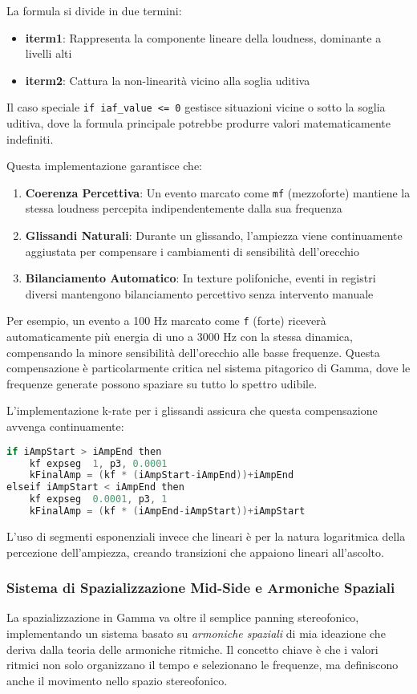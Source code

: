 La formula si divide in due termini:
\begin{itemize}
    \item \textbf{iterm1}: Rappresenta la componente lineare della loudness, dominante a livelli alti
    \item \textbf{iterm2}: Cattura la non-linearità vicino alla soglia uditiva
\end{itemize}

Il caso speciale \texttt{if iaf\_value <= 0} gestisce situazioni vicine o sotto la soglia uditiva, dove la formula principale potrebbe produrre valori matematicamente indefiniti.

Questa implementazione garantisce che:

\begin{enumerate}
    \item \textbf{Coerenza Percettiva}: Un evento marcato come \texttt{mf} (mezzoforte) mantiene la stessa loudness percepita indipendentemente dalla sua frequenza
    \item \textbf{Glissandi Naturali}: Durante un glissando, l'ampiezza viene continuamente aggiustata per compensare i cambiamenti di sensibilità dell'orecchio
    \item \textbf{Bilanciamento Automatico}: In texture polifoniche, eventi in registri diversi mantengono bilanciamento percettivo senza intervento manuale
\end{enumerate}
Per esempio, un evento a 100 Hz marcato come \texttt{f} (forte) riceverà automaticamente più energia di uno a 3000 Hz con la stessa dinamica, compensando la minore sensibilità dell'orecchio alle basse frequenze. Questa compensazione è particolarmente critica nel sistema pitagorico di Gamma, dove le frequenze generate possono spaziare su tutto lo spettro udibile.

L'implementazione k-rate per i glissandi assicura che questa compensazione avvenga continuamente:

\begin{lstlisting}[language=C]
if iAmpStart > iAmpEnd then
    kf expseg  1, p3, 0.0001
    kFinalAmp = (kf * (iAmpStart-iAmpEnd))+iAmpEnd
elseif iAmpStart < iAmpEnd then
    kf expseg  0.0001, p3, 1
    kFinalAmp = (kf * (iAmpEnd-iAmpStart))+iAmpStart
\end{lstlisting}

L'uso di segmenti esponenziali invece che lineari è per la natura logaritmica della percezione dell'ampiezza, creando transizioni che appaiono lineari all'ascolto.
\subsubsection{Sistema di Spazializzazione Mid-Side e Armoniche Spaziali}
La spazializzazione in Gamma va oltre il semplice panning stereofonico, implementando un sistema basato su \textit{armoniche spaziali} di mia ideazione che deriva dalla teoria delle armoniche ritmiche. Il concetto chiave è che i valori ritmici non solo organizzano il tempo e selezionano le frequenze, ma definiscono anche il movimento nello spazio stereofonico.

